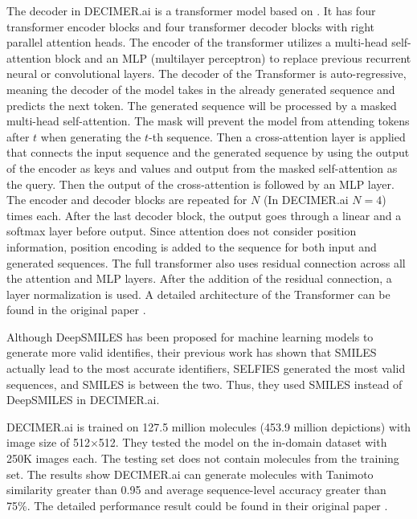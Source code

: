 \documentclass[12pt]{article}
\begin{document}
The decoder in DECIMER.ai is a transformer model based on \autocite{attention_is_all_you_need}. It has four transformer encoder blocks and four transformer decoder blocks with right parallel attention heads. \autocite{decimer} The encoder of the transformer utilizes a multi-head self-attention block and an MLP (multilayer perceptron) to replace previous recurrent neural or convolutional layers. The decoder of the Transformer is auto-regressive, meaning the decoder of the model takes in the already generated sequence and predicts the next token. The generated sequence will be processed by a masked multi-head self-attention. The mask will prevent the model from attending tokens after $t$ when generating the $t$-th sequence. Then a cross-attention layer is applied that connects the input sequence and the generated sequence by using the output of the encoder as keys and values and output from the masked self-attention as the query. Then the output of the cross-attention is followed by an MLP layer. The encoder and decoder blocks are repeated for $N$ (In DECIMER.ai $N=4$) times each. After the last decoder block, the output goes through a linear and a softmax layer before output. Since attention does not consider position information, position encoding is added to the sequence for both input and generated sequences. The full transformer also uses residual connection across all the attention and MLP layers. After the addition of the residual connection, a layer normalization is used. A detailed architecture of the Transformer can be found in the original paper \autocite{attention_is_all_you_need}. 

Although DeepSMILES \autocite{oboyle_deepsmiles:_2018} has been proposed for machine learning models to generate more valid identifies, their previous work \autocite{rajan_performance_2022} has shown that SMILES actually lead to the most accurate identifiers, SELFIES \autocite{krenn_self-referencing_2020} generated the most valid sequences, and SMILES is between the two. Thus, they used SMILES instead of DeepSMILES in DECIMER.ai. \autocite{decimer}  

DECIMER.ai is trained on 127.5 million molecules (453.9 million depictions) with image size of 512$\times$512. They tested the model on the in-domain dataset with 250K images each. The testing set does not contain molecules from the training set. The results show DECIMER.ai can generate molecules with Tanimoto similarity greater than 0.95 and average sequence-level accuracy greater than 75\%. The detailed performance result could be found in their original paper \autocite{decimer}. 
\end{document}
